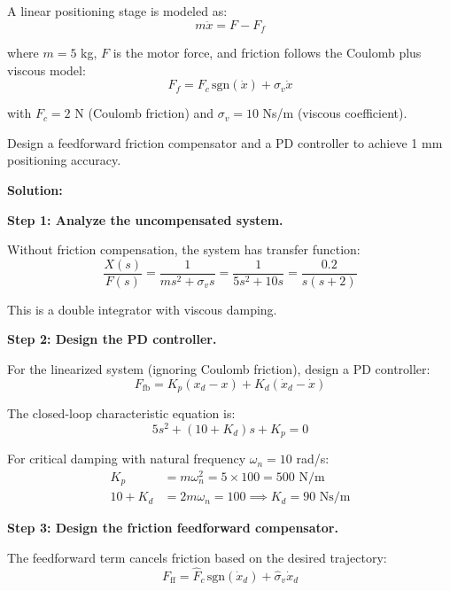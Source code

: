 \begin{example}
\label{ex:friction_compensation}
A linear positioning stage is modeled as:
\begin{equation}
m\ddot{x} = F - F_f
\end{equation}

where $m = 5$ kg, $F$ is the motor force, and friction follows the Coulomb plus viscous model:
\begin{equation}
F_f = F_c \, \text{sgn}(\dot{x}) + \sigma_v \dot{x}
\end{equation}

with $F_c = 2$ N (Coulomb friction) and $\sigma_v = 10$ Ns/m (viscous coefficient).

Design a feedforward friction compensator and a PD controller to achieve 1 mm positioning accuracy.

\textbf{Solution:}

\textbf{Step 1: Analyze the uncompensated system.}

Without friction compensation, the system has transfer function:
\begin{equation}
\frac{X(s)}{F(s)} = \frac{1}{ms^2 + \sigma_v s} = \frac{1}{5s^2 + 10s} = \frac{0.2}{s(s+2)}
\end{equation}

This is a double integrator with viscous damping.

\textbf{Step 2: Design the PD controller.}

For the linearized system (ignoring Coulomb friction), design a PD controller:
\begin{equation}
F_{\text{fb}} = K_p(x_d - x) + K_d(\dot{x}_d - \dot{x})
\end{equation}

The closed-loop characteristic equation is:
\begin{equation}
5s^2 + (10 + K_d)s + K_p = 0
\end{equation}

For critical damping with natural frequency $\omega_n = 10$ rad/s:
\begin{align}
K_p &= m\omega_n^2 = 5 \times 100 = 500 \text{ N/m} \\
10 + K_d &= 2m\omega_n = 100 \implies K_d = 90 \text{ Ns/m}
\end{align}

\textbf{Step 3: Design the friction feedforward compensator.}

The feedforward term cancels friction based on the desired trajectory:
\begin{equation}
F_{\text{ff}} = \hat{F}_c \, \text{sgn}(\dot{x}_d) + \hat{\sigma}_v \dot{x}_d
\end{equation}


\end{example}

